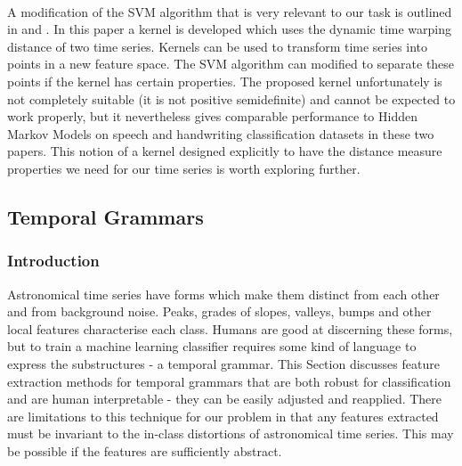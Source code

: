 	\paragraph{}
	A modification of the SVM algorithm that is very relevant to our task is outlined in \citep{shimodaira2002dynamic} and \citep{bahlmann2002online}. In this paper a kernel is developed which uses the dynamic time warping distance of two time series. Kernels can be used to transform time series into points in a new feature space. The SVM algorithm can modified to separate these points if the kernel has certain properties. The proposed kernel unfortunately is not completely suitable (it is not positive semidefinite) and cannot be expected to work properly, but it nevertheless gives comparable performance to Hidden Markov Models on speech and handwriting classification datasets in these two papers. This notion of a kernel designed explicitly to have the distance measure properties we need for our time series is worth exploring further.
	
	
	\subsection{Temporal Grammars}
	\subsubsection{Introduction}
	Astronomical time series have forms which make them distinct from each other and from background noise. Peaks, grades of slopes, valleys, bumps and other local features characterise each class. Humans are good at discerning these forms, but to train a machine learning classifier requires some kind of language to express the substructures - a temporal grammar. This Section discusses feature extraction methods for temporal grammars that are both robust for classification and are human interpretable - they can be easily adjusted and reapplied. There are limitations to this technique for our problem in that any features extracted must be invariant to the in-class distortions of astronomical time series. This may be possible if the features are sufficiently abstract.
